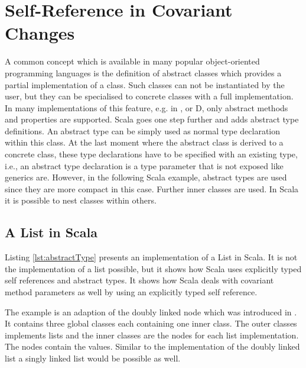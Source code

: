 \section{Self-Reference in Covariant Changes}
A common concept which is available in many popular object-oriented
programming languages is the definition of abstract classes which provides
a partial implementation of a class. Such classes can not be instantiated
by the user, but they can be specialised to concrete classes with a full
implementation. In many implementations of this feature, e.g. in \cpp,
\cs or D, only abstract methods and properties are supported. Scala
goes one step further and adds abstract type definitions. An abstract
type can be simply used as normal type declaration within this class. At
the last moment where the abstract class is derived to a concrete class,
these type declarations have to be specified with an existing type, i.e.,
an abstract type declaration is a type parameter that is not exposed
like generics are. However, in the following Scala example, abstract
types are used since they are more compact in this case. Further inner
classes are used. In Scala it is possible to nest classes within others.

\subsection{A List in Scala}
Listing \ref{lst:abstractType} presents an implementation of a List
in Scala. It is not the implementation of a list possible, but it shows
how Scala uses explicitly typed self references and abstract types. It
shows how Scala deals with covariant method parameters as well by using
an explicitly typed self reference.

The example is an adaption of the doubly linked node which was
introduced in . It contains three global classes
each containing one inner class. The outer classes implements lists and
the inner classes are the nodes for each list implementation. The nodes
contain the values.  Similar to the implementation of the doubly linked
list a singly linked list would be possible as well.


